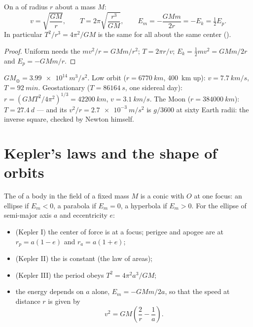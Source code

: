 \begin{theorem}\label{thm:b1:central-forces:circular}
On a  of radius $r$ about a mass $M$:
\[
v = \sqrt{\frac{GM}{r}}, \qquad
T = 2\pi\sqrt{\frac{r^3}{GM}}, \qquad
E_m = -\frac{GMm}{2r} = -E_k = \tfrac12 E_p .
\]
In particular $T^2/r^3 = 4\pi^2/GM$ is the same for all 
about the same center ().
\end{theorem}

\begin{proof}
Uniform  needs the  $mv^2/r = GMm/r^2$;
$T = 2\pi r/v$; $E_k = \tfrac12 mv^2 = GMm/2r$ and $E_p = -GMm/r$.
\end{proof}

\begin{example}\label{ex:b1:central-forces:orbits}
$GM_\oplus = \qty{3.99e14}{m^3/s^2}$. Low orbit ($r = \qty{6770}{km}$,
\qty{400}{km} up): $v = \qty{7.7}{km/s}$, $T = \qty{92}{min}$. Geostationary
($T = \qty{86164}{s}$, one sidereal day): $r = (GMT^2/4\pi^2)^{1/3} =
\qty{42200}{km}$, $v = \qty{3.1}{km/s}$. The Moon ($r = \qty{384000}{km}$):
$T = \qty{27.4}{d}$ --- and its  $v^2/r =
\qty{2.7e-3}{m/s^2}$ is $g/3600$ at sixty Earth radii: the inverse
square, checked by Newton himself.
\end{example}

\section{Kepler's laws and the shape of orbits}

\begin{theorem}\label{thm:b1:central-forces:conics}
The  of a body in the field of a fixed mass $M$ is a conic
with $O$ at one focus: an ellipse if $E_m < 0$, a parabola if $E_m = 0$,
a hyperbola if $E_m > 0$. For the ellipse of semi-major axis $a$ and
eccentricity $e$:
\begin{itemize}
  \item (Kepler I) the center of force is at a focus; perigee and apogee
        are at $r_p = a(1 - e)$ and $r_a = a(1 + e)$;
  \item (Kepler II) the  is constant (the law of areas);
  \item (Kepler III) the period obeys $T^2 = 4\pi^2a^3/GM$;
  \item the energy depends on $a$ alone, $E_m = -GMm/2a$, so that the
        speed at distance $r$ is given by
        \[
        v^2 = GM\left(\frac{2}{r} - \frac{1}{a}\right) .
        \]
\end{itemize}
\end{theorem}
\admitted

